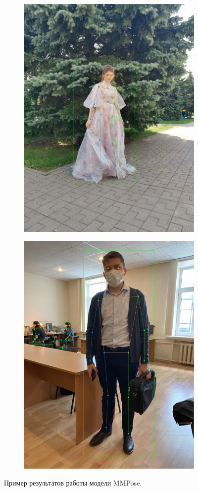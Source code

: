 \begin{figure}[h]
\begin{subfigure}[b]{.5\textwidth}
    \includegraphics[height=\textwidth]{./images/MMPose/36}
    \caption{ }
\end{subfigure}
\begin{subfigure}[b]{.5\textwidth}
	\centering
    \includegraphics[height=\textwidth]{./images/MMPose/33}
    \caption{ }
\end{subfigure}
    \caption{Пример результатов работы модели MMPose.}
    \label{fig:MMP_result}
\end{figure}

